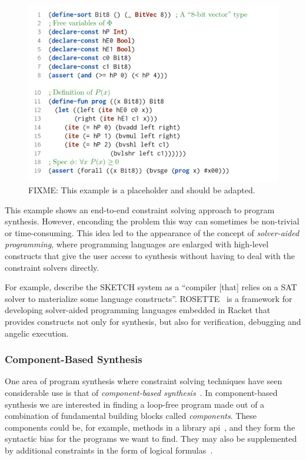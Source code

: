 \begin{figure}[h!]
  \centering
  \includegraphics[width=\textwidth]{assets/constraint-solving-smtlib.png}
  \caption{FIXME: This example is a placeholder and should be adapted.}
\end{figure}

This example shows an end-to-end constraint solving approach to program
synthesis. However, enconding the problem this way can sometimes be non-trivial
or time-consuming. This idea led to the appearance of the concept of
\textit{solver-aided programming}, where programming languages are enlarged with
high-level constructs that give the user access to synthesis without having to
deal with the constraint solvers directly.

For example, \citeauthor{Gulwani2017} describe the SKETCH system as a ``compiler
[that] relies on a SAT solver to materialize some language constructs''.
ROSETTE~\cite{Torlak:2013:GSL} is a framework for developing solver-aided
programming languages embedded in Racket that provides constructs not only for
synthesis, but also for verification, debugging and angelic execution.

\subsubsection{Component-Based Synthesis}
\label{sec:components}


One area of program synthesis where constraint solving techniques have seen
considerable use is that of \textit{component-based
synthesis}~\cite{Shi:2019:FCS,Feng:2018:PSU,Feng:2017:CST,Feng:2017:CSC,Jha:oracle:2010}.
In component-based synthesis we are interested in finding a loop-free program
made out of a combination of fundamental building blocks called
\textit{components}. These components could be, for example, methods in a
library \gls{api}~\cite{Shi:2019:FCS,Feng:2017:CSC}, and they form the syntactic
bias for the programs we want to find. They may also be supplemented by
additional constraints in the form of logical formulas~\cite{Feng:2018:PSU}.



